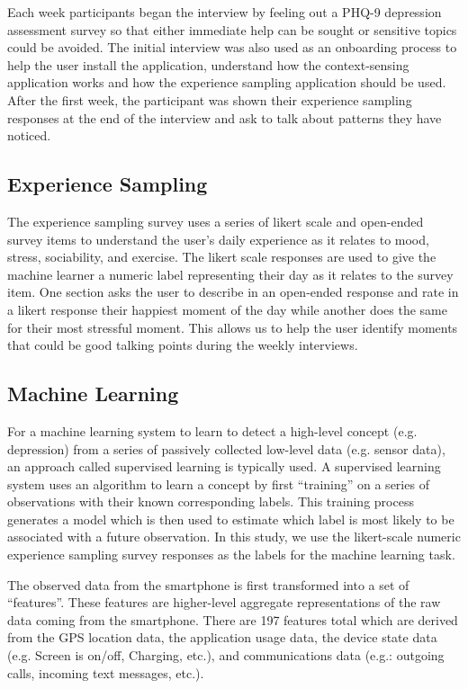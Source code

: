 Each week participants began the interview by feeling out a PHQ-9 depression
assessment survey so that either immediate help can be sought or 
sensitive topics could be avoided. The initial interview
was also used as an onboarding process to help the user 
install the application, understand how the context-sensing application
works and how the experience sampling application should be used.
After the first week, the participant was shown their experience
sampling responses at the end of the interview and ask to talk 
about patterns they have noticed.

\subsection{Experience Sampling}
The experience sampling survey uses a series of 
likert scale and open-ended 
survey items to understand the
user's daily experience as it relates to 
mood, stress, sociability, and exercise.
The likert scale responses are used to 
give the machine learner a numeric label
representing their day as it relates to the survey item.
One section asks the user to describe in an open-ended
response and rate in a likert response their happiest 
moment of the day while another does the same for their
most stressful moment. This allows us to help the user 
identify moments that could be good talking points during
the weekly interviews.

\subsection{Machine Learning}
For a machine learning system to learn to detect a high-level concept (e.g. depression)
from a series of passively collected low-level data (e.g. sensor data), an approach 
called supervised learning is typically used.  A supervised learning system uses
an algorithm to learn a concept by first “training” on a series of observations with their known corresponding 
labels. This training process generates a model which is then used to estimate which label is most
likely to be associated with a future observation.  In this study, we use the likert-scale
numeric experience sampling survey responses as the labels for the machine learning task.

The observed data from the smartphone is first transformed into a set of ``features''.  These
features are higher-level aggregate representations of the raw data coming from the smartphone.
There are 197 features total which are derived from the GPS location data, the application usage data,
the device state data (e.g. Screen is on/off, Charging, etc.), 
and communications data (e.g.: outgoing calls, incoming text messages, etc.).

